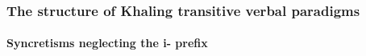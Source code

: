 \begin{frame} 
\frametitle{The structure of  Khaling transitive verbal paradigms} 
\framesubtitle{Syncretisms neglecting the \textglotstop{}i- prefix}


\begin{table}[H]
\vspace*{-.3cm}

\end{table}
\end{frame}
